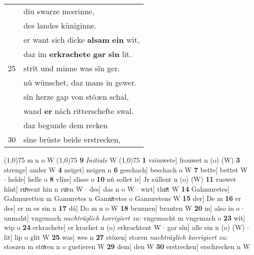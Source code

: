\documentclass[8pt,a4paper,notitlepage]{article}
\begin{document}
\begin{table}[ht]
\begin{minipage}[t]{0.5\linewidth}
\begin{tabular}{rl}
 & diu swarze mœrinne,\\ 
 & des landes küniginne.\\ 
 & er want sich dicke \textbf{alsam} \textbf{ein} wit,\\ 
 & daz im \textbf{erkrachete} \textbf{gar} \textbf{sîn} lit.\\ 
25 & strît und minne was sîn ger.\\ 
 & nû wünschet, daz mans in gewer.\\ 
 & sîn herze gap von stô\textit{z}en schal,\\ 
 & wand \textbf{er} nâch ritterschefte swal.\\ 
 & daz begunde dem recken\\ 
30 & sîne brüste beide erstrecken,\\ 
\end{tabular}
\scriptsize
\line(1,0){75} \newline
m n o W \newline
\line(1,0){75} \newline
\textbf{9} \textit{Initiale} W  \newline
\line(1,0){75} \newline
\textbf{1} vröuwete] frouwet n (o) (W) \textbf{3} strenge] ander W \textbf{4} neiget] neigen n \textbf{6} geschach] beschach o W \textbf{7} bette] bettet W  $\cdot$ helde] helle o \textbf{8} vlîze] slisse o \textbf{10} nû sollet ir] Jr súllent n (o) (W) \textbf{11} ruowet hînt] ruͦwent hin n ruͦen W  $\cdot$ des] das n o W  $\cdot$ wirt] thuͦt W \textbf{14} Gahmuretes] Gahmuretten m Gamuretes n Gamuͯretes o Gamuretens W \textbf{15} der] De m \textbf{16} er des] er m es sin n \textbf{17} dâ] Do m n o W \textbf{18} brunnen] branten W \textbf{20} in] also in o  $\cdot$ unmaht] vngemach \textit{nachträglich korrigiert zu:} vngemacht m vngemach o \textbf{23} wit] wip o \textbf{24} erkrachete] er krachet n (o) erkrachtent W  $\cdot$ gar sîn] alle sin n (o) (W)  $\cdot$ lit] lip o glit W \textbf{25} was] wes n \textbf{27} stôzen] storen \textit{nachträglich korrigiert zu:} stoszen m stoͯren n o gustieren W \textbf{29} dem] den W \textbf{30} erstrecken] erschrecken n W \newline
\end{minipage}
\end{table}
\newpage
\end{document}
